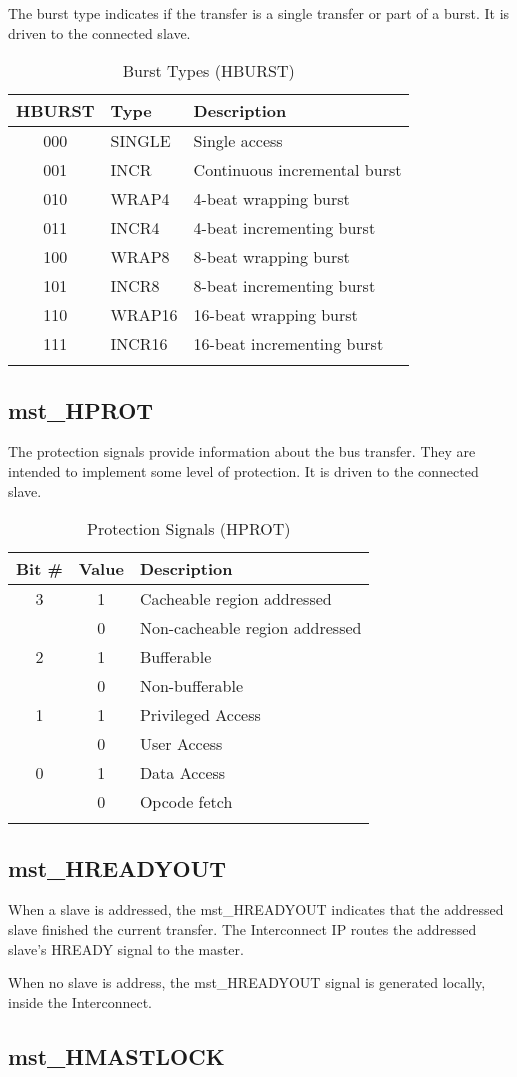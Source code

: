 The burst type indicates if the transfer is a single transfer or part of
a burst. It is driven to the connected slave.

\begin{longtable}[]{@{}cll@{}}
\toprule
HBURST & Type & Description\tabularnewline
\midrule
\endhead
000 & SINGLE & Single access\tabularnewline
001 & INCR & Continuous incremental burst\tabularnewline
010 & WRAP4 & 4-beat wrapping burst\tabularnewline
011 & INCR4 & 4-beat incrementing burst\tabularnewline
100 & WRAP8 & 8-beat wrapping burst\tabularnewline
101 & INCR8 & 8-beat incrementing burst\tabularnewline
110 & WRAP16 & 16-beat wrapping burst\tabularnewline
111 & INCR16 & 16-beat incrementing burst\tabularnewline
\bottomrule
\caption{Burst Types (HBURST)}
\end{longtable}

\subsection{mst\_HPROT}\label{mst_hprot}

The protection signals provide information about the bus transfer. They
are intended to implement some level of protection. It is driven to the
connected slave.

\begin{longtable}[]{@{}ccl@{}}
\toprule
Bit \# & Value & Description\tabularnewline
\midrule
\endhead
3 & 1 & Cacheable region addressed\tabularnewline
& 0 & Non-cacheable region addressed\tabularnewline
2 & 1 & Bufferable\tabularnewline
& 0 & Non-bufferable\tabularnewline
1 & 1 & Privileged Access\tabularnewline
& 0 & User Access\tabularnewline
0 & 1 & Data Access\tabularnewline
& 0 & Opcode fetch\tabularnewline
\bottomrule
\caption{Protection Signals (HPROT)}
\end{longtable}

\subsection{mst\_HREADYOUT}\label{mst_hreadyout}

When a slave is addressed, the mst\_HREADYOUT indicates that the
addressed slave finished the current transfer. The Interconnect IP
routes the addressed slave's HREADY signal to the master.

When no slave is address, the mst\_HREADYOUT signal is generated
locally, inside the Interconnect.

\subsection{mst\_HMASTLOCK}\label{mst_hmastlock}

